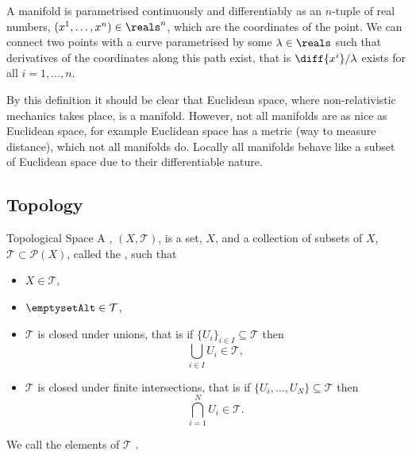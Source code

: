 \documentclass[fleqn]{NotesClass}
\begin{document}
    A manifold is parametrised continuously and differentiably as an \(n\)-tuple of real numbers, \((x^1, \dotsc, x^n) \in \reals^n\), which are the coordinates of the point.
    We can connect two points with a curve parametrised by some \(\lambda \in \reals\) such that derivatives of the coordinates along this path exist, that is \(\diff{x^i}/{\lambda}\) exists for all \(i = 1, \dotsc, n\).
    
    By this definition it should be clear that Euclidean space, where non-relativistic mechanics takes place, is a manifold.
    However, not all manifolds are as nice as Euclidean space, for example Euclidean space has a metric (way to measure distance), which not all manifolds do.
    Locally all manifolds behave like a subset of Euclidean space due to their differentiable nature.
    
    \subsection{Topology}
    \begin{dfn}{Topological Space}{}
        A , \((X, \mathcal{T})\), is a set, \(X\), and a collection of subsets of \(X\), \(\mathcal{T} \subset \mathcal{P}(X)\), called the , such that
        \begin{itemize}
            \item \(X \in \mathcal{T}\),
            \item \(\emptysetAlt \in \mathcal{T}\),
            \item \(\mathcal{T}\) is closed under unions, that is if \(\{U_i\}_{i \in I} \subseteq \mathcal{T}\) then\vspace{-1ex}
            \begin{equation}
                \bigcup_{i\in I} U_i \in \mathcal{T},
            \end{equation}\vspace{-4ex}
            \item \(\mathcal{T}\) is closed under finite intersections, that is if \(\{U_i, \dotsc, U_N\} \subseteq \mathcal{T}\) then\vspace{-4ex}
            \begin{equation}
                \bigcap_{i = 1}^{N} U_i \in \mathcal{T}.
            \end{equation}
        \end{itemize}\vspace{-1ex}
        We call the elements of \(\mathcal{T}\) .
    \end{dfn}
    
\end{document}
